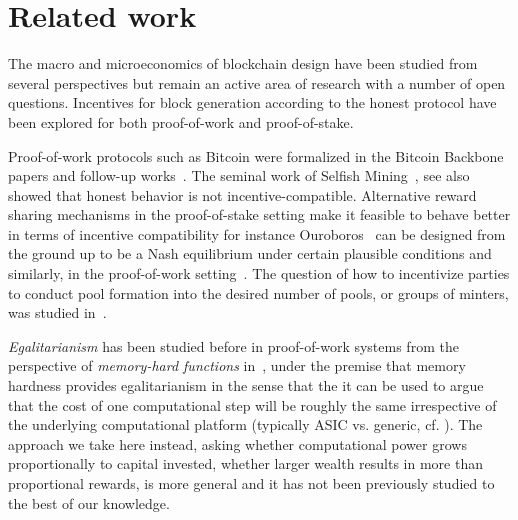 \section{Related work}\label{sec:related}
The macro and microeconomics of blockchain design have been studied from
several perspectives but remain an active area of research with a number of open questions.
Incentives for block generation
according to the honest protocol have been explored for both proof-of-work and
proof-of-stake.

Proof-of-work protocols such as Bitcoin were formalized in the Bitcoin
Backbone~\cite{EC:GarKiaLeo15,C:GarKiaLeo17} papers and follow-up
works~\cite{pass2017analysis}. The seminal work of Selfish
Mining~\cite{FC:EyaSir14}, see also \cite{FC:SapSomZoh16,kiayias2016blockchain} showed that 
honest behavior is not incentive-compatible. Alternative reward sharing mechanisms 
in the proof-of-stake  setting
make it feasible to behave better in terms of incentive compatibility for instance
Ouroboros~\cite{C:KRDO17} can be designed from the ground up to be a Nash 
equilibrium under certain plausible conditions 
and similarly, in the proof-of-work setting~\cite{PODC:PasShi17}. 
The question of how to incentivize parties to conduct
pool formation into the desired number of pools, or groups of minters, was
studied in~\cite{bkks2018}.
%

\emph{Egalitarianism} has been studied before in
proof-of-work systems from the perspective of 
\emph{memory-hard functions} in~\cite{alwen2017depth,biryukov2016egalitarian},
under the premise that memory hardness provides egalitarianism in the sense
that the it can be used to argue that the 
cost of one computational step will be roughly  the same irrespective of the
underlying  
computational platform (typically ASIC vs. generic, cf.  \cite{biryukov2016egalitarian}). 
The approach we take here instead, asking whether 
computational power grows proportionally to capital invested, \ie
whether larger wealth results in more than proportional rewards,
  is more general and it has not
been previously studied to the best of our knowledge. 

